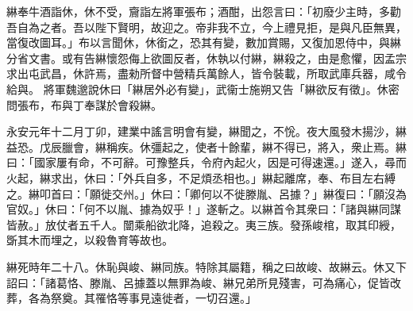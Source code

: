 \begin{pinyinscope}
 
綝奉牛酒詣休，休不受，齎詣左將軍張布；酒酣，出怨言曰：「初廢少主時，多勸吾自為之者。吾以陛下賢明，故迎之。帝非我不立，今上禮見拒，是與凡臣無異，當復改圖耳。」布以言聞休，休銜之，恐其有變，數加賞賜，又復加恩侍中，與綝分省文書。或有告綝懷怨侮上欲圖反者，休執以付綝，綝殺之，由是愈懼，因孟宗求出屯武昌，休許焉，盡勑所督中營精兵萬餘人，皆令裝載，所取武庫兵器，咸令給與。
 將軍魏邈說休曰「綝居外必有變」，武衞士施朔又告「綝欲反有徵」。休密問張布，布與丁奉謀於會殺綝。
 
 
 
 
 永安元年十二月丁卯，建業中謠言明會有變，綝聞之，不恱。夜大風發木揚沙，綝益恐。戊辰臘會，綝稱疾。休彊起之，使者十餘輩，綝不得已，將入，衆止焉。綝曰：「國家屢有命，不可辭。可豫整兵，令府內起火，因是可得速還。」遂入，尋而火起，綝求出，休曰：「外兵自多，不足煩丞相也。」綝起離席，奉、布目左右縛之。綝叩首曰：「願徙交州。」休曰：「卿何以不徙滕胤、呂據？」綝復曰：「願沒為官奴。」休曰：「何不以胤、據為奴乎！」遂斬之。以綝首令其衆曰：「諸與綝同謀皆赦。」放仗者五千人。闓乘船欲北降，追殺之。夷三族。發孫峻棺，取其印綬，斲其木而埋之，以殺魯育等故也。
 
 
 
 
 綝死時年二十八。休恥與峻、綝同族。特除其屬籍，稱之曰故峻、故綝云。休又下詔曰：「諸葛恪、滕胤、呂據蓋以無罪為峻、綝兄弟所見殘害，可為痛心，促皆改葬，各為祭奠。其罹恪等事見遠徙者，一切召還。」
 
 
\end{pinyinscope}